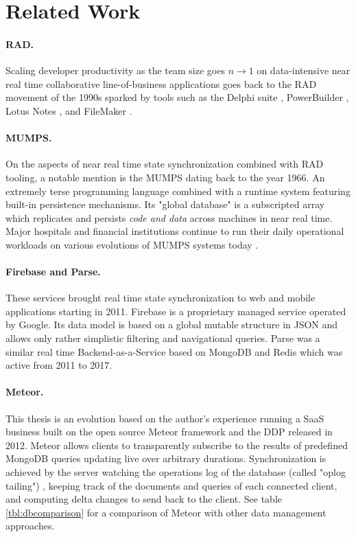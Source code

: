 \cleardoublepage
\section{Related Work}\label{sec:related_work}



\paragraph{\gls{RAD}.} Scaling developer productivity as the team size goes $n \to 1$ on data-intensive near real time collaborative line-of-business applications goes back to the \gls{RAD} movement of the 1990s sparked by tools such as the Delphi suite \cite{mackay2000reconfiguring}, PowerBuilder \cite{zubeck1997implementing}, Lotus Notes \cite{zubeck1997implementing}, and FileMaker
\cite{chen2010developing}.

\paragraph{MUMPS.} On the aspects of near real time state synchronization combined with RAD tooling, a notable mention is the \gls{MUMPS} \cite{bowie1979methods} dating back to the year 1966. An extremely terse programming language combined with a runtime system featuring built-in persistence mechanisms. Its "global database" is a subscripted array which replicates and persists \emph{code and data} across machines in near real time. Major hospitals and financial institutions continue to run their daily operational workloads on various evolutions of MUMPS systems today \cite{aller2018evolution}.

\paragraph{Firebase and Parse.} These services brought real time state synchronization to web and mobile applications starting in 2011. Firebase is a proprietary managed service operated by Google. Its data model is based on a global mutable structure in \gls{JSON} and allows only rather simplistic filtering and navigational queries. Parse was a similar real time Backend-as-a-Service based on MongoDB and Redis which was active from 2011 to 2017. \cite{wingerath2019real}

\paragraph{Meteor.} This thesis is an evolution based on the author's experience running a \gls{SaaS} business built on the open source Meteor \cite{schmidt2014live} framework and the \gls{DDP} \cite{ddpspec} released in 2012. Meteor allows clients to transparently subscribe to the results of predefined MongoDB queries updating live over arbitrary durations. Synchronization is achieved by the server watching the operations log of the database (called "oplog tailing") \cite{wingerath2019real}, keeping track of the documents and queries of each connected client, and computing delta changes to send back to the client. See table \ref{tbl:dbcomparison} for a comparison of Meteor with other data management approaches.

